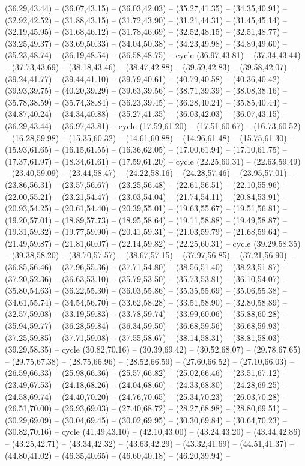 {(36.29,43.44) -- (36.07,43.15) -- (36.03,42.03) -- (35.27,41.35) -- (34.35,40.91) -- (32.92,42.52) -- (31.88,43.15) -- (31.72,43.90) -- (31.21,44.31) -- (31.45,45.14) -- (32.19,45.95) -- (31.68,46.12) -- (31.78,46.69) -- (32.52,48.15) -- (32.51,48.77) -- (33.25,49.37) -- (33.69,50.33) -- (34.04,50.38) -- (34.23,49.98) -- (34.89,49.60) -- (35.23,48.74) -- (36.19,48.54) -- (36.58,48.75) -- cycle (36.97,43.81) -- (37.34,43.44) -- (37.73,43.69) -- (38.18,43.46) -- (38.47,42.88) -- (39.59,42.83) -- (39.58,42.07) -- (39.24,41.77) -- (39.44,41.10) -- (39.79,40.61) -- (40.79,40.58) -- (40.36,40.42) -- (39.93,39.75) -- (40.20,39.29) -- (39.63,39.56) -- (38.71,39.39) -- (38.08,38.16) -- (35.78,38.59) -- (35.74,38.84) -- (36.23,39.45) -- (36.28,40.24) -- (35.85,40.44) -- (34.87,40.24) -- (34.34,40.88) -- (35.27,41.35) -- (36.03,42.03) -- (36.07,43.15) -- (36.29,43.44) -- (36.97,43.81) -- cycle (17.59,61.20) -- (17.51,60.67) -- (16.73,60.52) -- (16.28,59.98) -- (15.35,60.32) -- (14.61,60.88) -- (14.96,61.48) -- (15.75,61.30) -- (15.93,61.65) -- (16.15,61.55) -- (16.36,62.05) -- (17.00,61.94) -- (17.10,61.75) -- (17.37,61.97) -- (18.34,61.61) -- (17.59,61.20) -- cycle (22.25,60.31) -- (22.63,59.49) -- (23.40,59.09) -- (23.44,58.47) -- (24.22,58.16) -- (24.28,57.46) -- (23.95,57.01) -- (23.86,56.31) -- (23.57,56.67) -- (23.25,56.48) -- (22.61,56.51) -- (22.10,55.96) -- (22.00,55.21) -- (23.21,54.47) -- (23.03,54.04) -- (21.74,54.11) -- (20.84,53.91) -- (20.93,54.25) -- (20.61,54.40) -- (20.39,55.01) -- (19.63,55.67) -- (19.51,56.81) -- (19.20,57.01) -- (18.89,57.73) -- (18.95,58.64) -- (19.11,58.88) -- (19.49,58.87) -- (19.31,59.32) -- (19.77,59.90) -- (20.41,59.31) -- (21.03,59.79) -- (21.68,59.64) -- (21.49,59.87) -- (21.81,60.07) -- (22.14,59.82) -- (22.25,60.31) -- cycle (39.29,58.35) -- (39.38,58.20) -- (38.70,57.57) -- (38.67,57.15) -- (37.97,56.85) -- (37.21,56.90) -- (36.85,56.46) -- (37.96,55.36) -- (37.71,54.80) -- (38.56,51.40) -- (38.23,51.87) -- (37.20,52.36) -- (36.63,53.10) -- (35.79,53.50) -- (35.73,53.81) -- (36.10,54.07) -- (35.80,54.63) -- (36.22,55.30) -- (36.03,55.86) -- (35.35,55.69) -- (35.06,55.38) -- (34.61,55.74) -- (34.54,56.70) -- (33.62,58.28) -- (33.51,58.90) -- (32.80,58.89) -- (32.57,59.08) -- (33.19,59.83) -- (33.78,59.74) -- (33.99,60.06) -- (35.88,60.28) -- (35.94,59.77) -- (36.28,59.84) -- (36.34,59.50) -- (36.68,59.56) -- (36.68,59.93) -- (37.25,59.85) -- (37.71,59.08) -- (37.55,58.67) -- (38.14,58.31) -- (38.81,58.03) -- (39.29,58.35) -- cycle (30.82,70.16) -- (30.39,69.42) -- (30.52,68.07) -- (29.78,67.65) -- (29.75,67.38) -- (28.75,66.96) -- (28.52,66.59) -- (27.60,66.52) -- (27.10,66.03) -- (26.59,66.33) -- (25.98,66.36) -- (25.57,66.82) -- (25.02,66.46) -- (23.51,67.12) -- (23.49,67.53) -- (24.18,68.26) -- (24.04,68.60) -- (24.33,68.80) -- (24.28,69.25) -- (24.58,69.74) -- (24.40,70.20) -- (24.76,70.65) -- (25.34,70.23) -- (26.03,70.28) -- (26.51,70.00) -- (26.93,69.03) -- (27.40,68.72) -- (28.27,68.98) -- (28.80,69.51) -- (30.29,69.09) -- (30.04,69.45) -- (30.02,69.95) -- (30.30,69.84) -- (30.64,70.23) -- (30.82,70.16) -- cycle (41.49,43.10) -- (42.10,43.00) -- (43.24,43.20) -- (43.44,42.86) -- (43.25,42.71) -- (43.34,42.32) -- (43.63,42.29) -- (43.32,41.69) -- (44.51,41.37) -- (44.80,41.02) -- (46.35,40.65) -- (46.60,40.18) -- (46.20,39.94) -- }
